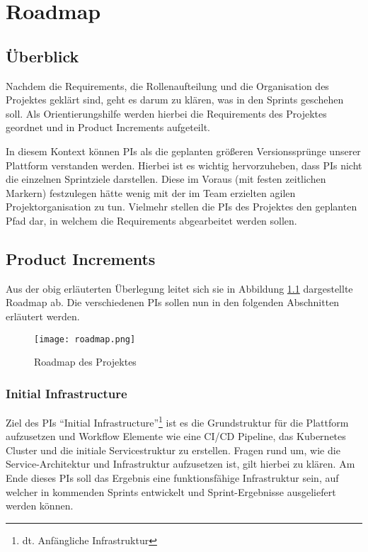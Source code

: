 
\chapter{Roadmap}

\section{Überblick}
Nachdem die Requirements, die Rollenaufteilung und die Organisation des Projektes geklärt sind, geht es darum zu klären, was in den Sprints geschehen soll.
Als Orientierungshilfe werden hierbei die Requirements des Projektes geordnet und in Product Increments aufgeteilt.

In diesem Kontext können \acp{PI} als die geplanten größeren Versionssprünge unserer Plattform verstanden werden.
Hierbei ist es wichtig hervorzuheben, dass \acp{PI} nicht die einzelnen Sprintziele darstellen.
Diese im Voraus (mit festen zeitlichen Markern) festzulegen hätte wenig mit der im Team erzielten agilen Projektorganisation zu tun.
Vielmehr stellen die \acp{PI} des Projektes den geplanten Pfad dar, in welchem die Requirements abgearbeitet werden sollen.

\section{Product Increments}
Aus der obig erläuterten Überlegung leitet sich sie in Abbildung \ref{fig:roadmap} dargestellte Roadmap ab.
Die verschiedenen \acp{PI} sollen nun in den folgenden Abschnitten erläutert werden.

\begin{figure}
    \centering
    \texttt{[image: roadmap.png]}
    \caption{Roadmap des Projektes}
    \label{fig:roadmap}
\end{figure}

\subsection{Initial Infrastructure}
Ziel des \acp{PI} \enquote{Initial Infrastructure}\footnote{dt. Anfängliche Infrastruktur} ist es die Grundstruktur für die Plattform aufzusetzen und Workflow Elemente wie eine \ac{CI/CD} Pipeline, das Kubernetes Cluster und die initiale Servicestruktur zu erstellen.
Fragen rund um, wie die Service-Architektur und Infrastruktur aufzusetzen ist, gilt hierbei zu klären.
Am Ende dieses \acp{PI} soll das Ergebnis eine funktionsfähige Infrastruktur sein, auf welcher in kommenden Sprints entwickelt und Sprint-Ergebnisse ausgeliefert werden können.

